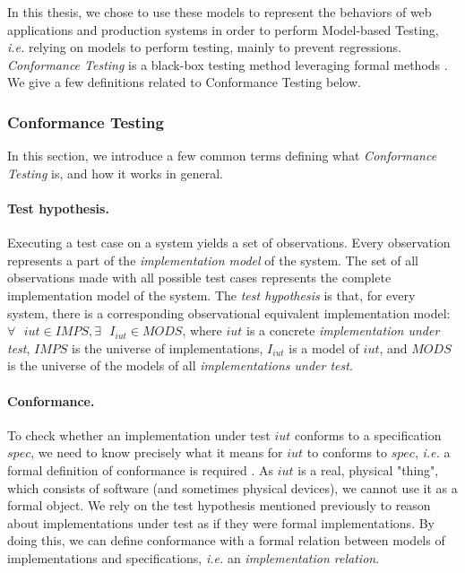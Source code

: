 In this thesis, we chose to use these models to represent the
behaviors of web applications and production systems in order to
perform Model-based Testing, \emph{i.e.} relying on models to
perform testing, mainly to prevent regressions. \emph{Conformance
Testing} is a black-box testing method leveraging formal methods
\cite{tretmans1992formal}. We give a few definitions related to
Conformance Testing below.

\subsubsection{Conformance Testing}

In this section, we introduce a few common terms defining what
\emph{Conformance Testing}
\cite{brinksma1989formal,tretmans1992formal,Tretmans:1993:FAC:648128.747730}
is, and how it works in general.

\paragraph{Test hypothesis.} Executing a test case on a system
yields a set of observations. Every observation represents a
part of the \textit{implementation model} of the system. The set
of all observations made with all possible test cases represents
the complete implementation model of the system. The \emph{test
hypothesis} \cite{Bernot:1991:TAF:112287.112303} is that, for
every system, there is a corresponding observational equivalent
implementation model: $\forall \text{ } iut \in IMPS, \exists
\text{ } I_{iut} \in MODS$, where $iut$ is a concrete
\emph{implementation under test}, $IMPS$ is the universe of
implementations, $I_{iut}$ is a model of $iut$, and $MODS$ is the
universe of the models of all \emph{implementations under test}.

\paragraph{Conformance.} To check whether an implementation under
test $iut$ conforms to a specification $spec$, we need to know
precisely what it means for $iut$ to conforms to $spec$,
\emph{i.e.} a formal definition of conformance is required
\cite{ltsTretmans}. As $iut$ is a real, physical "thing", which
consists of software (and sometimes physical devices), we cannot
use it as a formal object. We rely on the test hypothesis
mentioned previously to reason about implementations under test
as if they were formal implementations. By doing this, we can
define conformance with a formal relation between models of
implementations and specifications, \emph{i.e.} an
\emph{implementation relation}.

